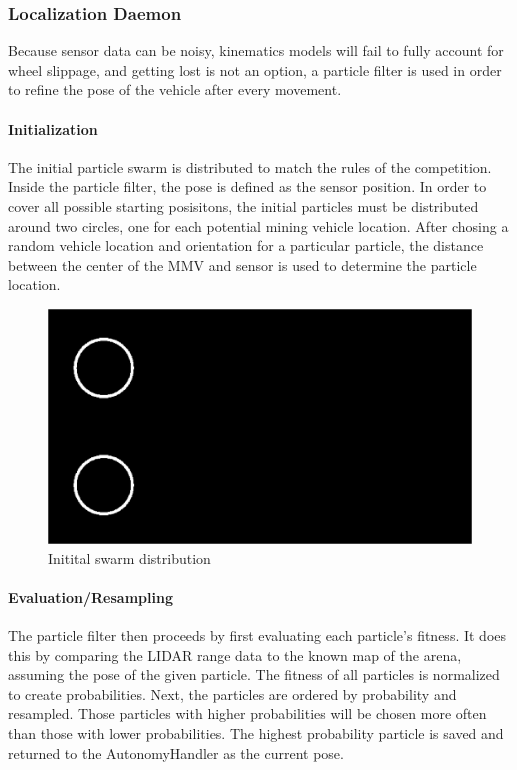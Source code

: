 \subsubsection{Localization Daemon}
Because sensor data can be noisy, kinematics models will fail to fully account for wheel slippage, and getting lost is not an option, a particle filter is used in order to refine the pose of the vehicle after every movement.
\paragraph{Initialization}
The initial particle swarm is distributed to match the rules of the competition.  Inside the particle filter, the pose is defined as the sensor position.  In order to cover all possible starting posisitons, the initial particles must be distributed around two circles, one for each potential mining vehicle location.  After chosing a random vehicle location and orientation for a particular particle, the distance between the center of the MMV and sensor is used to determine the particle location.
\begin{figure}[H]
\includegraphics[width=\linewidth]{swarm-init.png}
\caption{Initital swarm distribution}
\end{figure}
\paragraph{Evaluation/Resampling}
The particle filter then proceeds by first evaluating each particle's fitness.  It does this by comparing the LIDAR range data to the known map of the arena, assuming the pose of the given particle.  The fitness of all particles is normalized to create probabilities.  Next, the particles are ordered by probability and resampled.  Those particles with higher probabilities will be chosen more often than those with lower probabilities.  The highest probability particle is saved and returned to the AutonomyHandler as the current pose.
